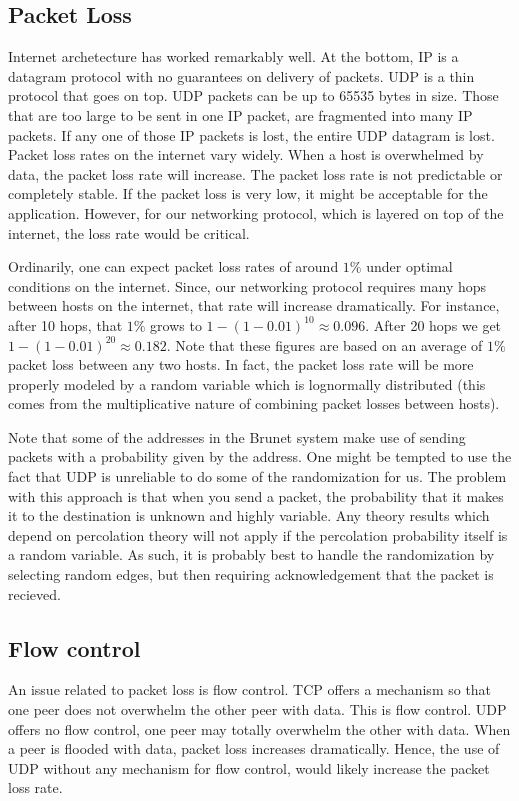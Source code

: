 \documentclass[11pt]{article}
\begin{document}
\subsection{Packet Loss}
Internet archetecture has worked remarkably well.  At the bottom, IP is a
datagram protocol with no guarantees on delivery of packets.  UDP is a thin
protocol that goes on top.  UDP packets can be up to 65535 bytes in size.
Those that are too large to be sent in one IP packet, are fragmented into many
IP packets.  If any one of those IP packets is lost, the entire UDP datagram
is lost.  Packet loss rates on the internet vary widely.  When a host is
overwhelmed by data, the packet loss rate will increase.  The packet loss rate
is not predictable or completely stable.  If the packet loss is very low, it
might be acceptable for the application.  However, for our networking
protocol, which is layered on top of the internet, the loss rate would be
critical.

Ordinarily, one can expect packet loss rates of around $1\%$ under
optimal conditions on the internet.  Since, our networking protocol requires
many hops between hosts on the internet, that rate will increase dramatically.
For instance, after 10 hops, that $1\%$ grows to $1-(1-0.01)^{10}\approx0.096$.
After 20 hops we get $1-(1-0.01)^{20}\approx0.182$.  Note that these figures are
based on an average of $1\%$ packet loss between any two hosts.  In fact, the
packet loss rate will be more properly modeled by a random variable which is
lognormally distributed (this comes from the multiplicative nature of combining
packet losses between hosts).

Note that some of the addresses in the Brunet system make use of sending packets
with a probability given by the address.  One might be tempted to use the fact
that UDP is unreliable to do some of the randomization for us.  The problem
with this approach is that when you send a packet, the probability that it makes
it to the destination is unknown and highly variable.  Any theory results which
depend on percolation theory will not apply if the percolation probability
itself is a random variable.  As such, it is probably best to handle the
randomization by selecting random edges, but then requiring acknowledgement that
the packet is recieved.

\subsection{Flow control}
An issue related to packet loss is flow control.  TCP offers a mechanism so that
one peer does not overwhelm the other peer with data.  This is flow control.
UDP offers no flow control, one peer may totally overwhelm the other with data.
When a peer is flooded with data, packet loss increases dramatically.  Hence,
the use of UDP without any mechanism for flow control, would likely increase the
packet loss rate.
\end{document}
